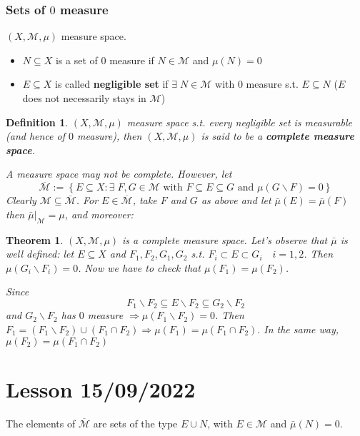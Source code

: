 \documentclass[a4paper,12pt]{article}
\theoremstyle{break}
\newtheorem{theorem}{Theorem}[section]
\newtheorem{definition}{Definition}[section]
\newcommand{\measurespace}{(X, \mathcal{M}, \mu)}
\numberwithin{equation}{section}
\begin{document}
\subsubsection*{Sets of \(0\) measure}
\((X, \mathcal{M}, \mu)\) measure space.
\begin{itemize}
    \item \(N \subseteq X\) is a set of \(0\) measure if \(N \in \mathcal{M}\) and \(\mu(N) = 0\)
    \item \(E \subseteq X\) is called \textbf{negligible set} if \(\exists \; N \in \mathcal{M}\) with \(0\) measure s.t. \(E \subseteq N\) (\(E\) does not necessarily stays in \(\mathcal{M}\))
\end{itemize} 
\begin{definition}
    \((X, \mathcal{M}, \mu)\) measure space s.t. every negligible set is measurable (and hence of \(0\) measure), then \(\measurespace\) is said to be a \textbf{complete measure space}.

    A measure space may not be complete. However, let 
    \[
        \overline{\mathcal{M}} := \left\lbrace E \subseteq X : \exists\; F, G \in \mathcal{M} \mbox{ with } F\subseteq E \subseteq G \mbox{ and } \mu(G\backslash F) = 0\right\rbrace
    \]
    Clearly \(\mathcal{M} \subseteq \overline{\mathcal{M}}\). For \(E \in \overline{\mathcal{M}}\), take \(F\) and \(G\) as above and let \(\bar{\mu}(E) = \bar{\mu}(F)\) then \(\bar{\mu}\vert_{\mathcal{M}} = \mu\), and moreover:
\end{definition}
\begin{theorem}
    \(\measurespace\) is a complete measure space. Let's observe that \(\bar{\mu}\) is well defined: let \(E \subseteq X\) and \(F_1,F_2, G_1, G_2\) s.t. \(F_i \subset E \subset G_i \quad i = 1,2\). Then \(\mu(G_i\backslash F_i) = 0\). Now we have to check that \(\mu(F_1) = \mu(F_2)\). 

    Since \[
        F_1 \backslash F_2 \subseteq E\backslash F_2 \subseteq G_2 \backslash F_2
    \] 
    and \(G_2 \backslash F_2\) has \(0\) measure \(\Longrightarrow \mu(F_1 \backslash F_2) = 0\). Then \(F_1 = (F_1 \backslash F_2) \cup (F_1 \cap F_2) \Longrightarrow \mu(F_1) = \mu(F_1 \cap F_2).\) In the same way, \(\mu(F_2) = \mu(F_1 \cap F_2)\)
\end{theorem}
\section{Lesson 15/09/2022}
The elements of \(\overline{\mathcal{M}}\) are sets of the type \(E \cup N\), with \(E \in \mathcal{M}\) and \(\bar{\mu}(N) = 0\).
\end{document}
